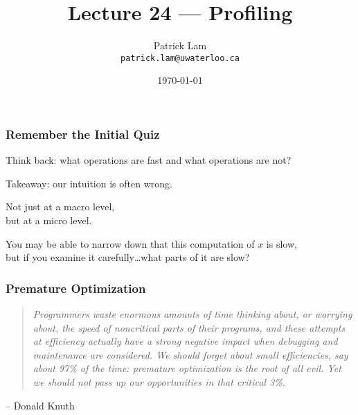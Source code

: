 

\title{Lecture 24 --- Profiling }

\author{Patrick Lam \\ \small \texttt{patrick.lam@uwaterloo.ca}}
\date{\today}




\begin{frame}
  \titlepage

 \end{frame}


\begin{frame}
\frametitle{Remember the Initial Quiz}

\Large
\begin{changemargin}{2cm}
Think back: what operations are fast and what operations are not?

Takeaway: our intuition  is often wrong. 

Not just at a macro level, \\
but at a micro level. 

You may be able to narrow down that this computation of $x$ is slow, \\
but if you examine it carefully\ldots what parts of it are slow?
\end{changemargin}

\end{frame}



\begin{frame}
\frametitle{Premature Optimization}

\vspace*{.5cm}
\Large
\begin{quote}
\textit{Programmers waste enormous amounts of time thinking about, or worrying about, the speed of noncritical parts of their programs, and these attempts at efficiency actually have a strong negative impact when debugging and maintenance are considered. We should forget about small efficiencies, say about 97\% of the time: premature optimization is the root of all evil. Yet we should not pass up our opportunities in that critical 3\%.}
\end{quote}
	\hfill -- Donald Knuth


\end{frame}



